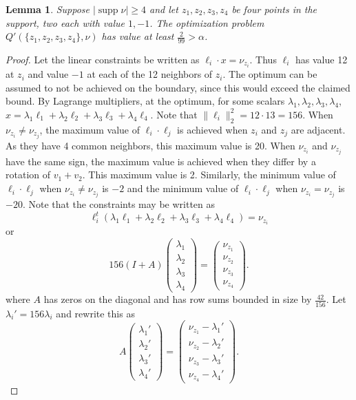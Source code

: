 \documentclass[a4paper, 12pt, notitlepage]{amsart}
\newcommand{\supp}{\operatorname{supp}}
\newtheorem{lemma}[theorem]{Lemma}
\theoremstyle{remark}
\begin{document}
\begin{lemma}
Suppose $|\supp \nu| \geq 4$ and let $z_1, z_2, z_3, z_4$ be four points in the support, two each with value $1, -1$.  The optimization problem $Q'(\{z_1, z_2, z_3, z_4\}, \nu)$ has value at least $\frac{2}{99} > \alpha$.  
 \end{lemma}
 \begin{proof}
Let the linear constraints be written as $\ell_i \cdot x = \nu_{z_i}$. Thus $\ell_i$ has value 12 at $z_i$ and value $-1$ at each of the 12 neighbors of $z_i$.  The optimum can be assumed to  not be achieved on the boundary, since this would exceed the claimed bound. By Lagrange multipliers, at the optimum, for some scalars $\lambda_1, \lambda_2, \lambda_3, \lambda_4$, $x = \lambda_1 \ell_1 + \lambda_2 \ell_2 +\lambda_3 \ell_3 + \lambda_4 \ell_4$.  Note that $\|\ell_i\|_2^2 = 12\cdot 13 = 156$.  When $\nu_{z_i} \neq \nu_{z_j}$, the maximum value of $\ell_i \cdot \ell_j$ is achieved when $z_i$ and $z_j$ are adjacent.  As they have 4 common neighbors, this maximum value is 20.  When $\nu_{z_i}$ and $\nu_{z_j}$ have the same sign, the maximum value is achieved when they differ by a rotation of $v_1 + v_2$. This maximum value is 2. Similarly, the minimum value of $\ell_i \cdot \ell_j$ when $\nu_{z_i} \neq \nu_{z_j}$ is $-2$ and the minimum value of $\ell_i \cdot \ell_j$ when $\nu_{z_i} = \nu_{z_j}$ is $-20$.  Note that the constraints may be written as
\begin{equation}
 \ell_i^t (\lambda_1 \ell_1 + \lambda_2 \ell_2 + \lambda_3 \ell_3 + \lambda_4 \ell_4) = \nu_{z_i}
\end{equation}
or
\begin{equation}
 156(I+A) \begin{pmatrix} \lambda_1\\ \lambda_2\\ \lambda_3\\\lambda_4 \end{pmatrix} = \begin{pmatrix} \nu_{z_1}\\ \nu_{z_2}\\ \nu_{z_3}\\ \nu_{z_4} \end{pmatrix}.
\end{equation}
where $A$ has zeros on the diagonal and has row sums bounded in size by $\frac{42}{156}$.  Let $\lambda_i' = 156 \lambda_i $ and rewrite this as
\begin{equation}
 A\begin{pmatrix} \lambda_1'\\ \lambda_2'\\ \lambda_3'\\\lambda_4' \end{pmatrix} = \begin{pmatrix} \nu_{z_1} - \lambda_1'\\ \nu_{z_2} - \lambda_2' \\ \nu_{z_3} - \lambda_3' \\ \nu_{z_4} -\lambda_4'\end{pmatrix}.

\end{equation}
\end{proof}
\end{document}
